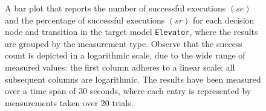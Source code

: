 \begin{figure}[h!]
\centering
\begin{minipage}{1\textwidth}
  \centering
  \makebox[\textwidth][c]{ %
        \resizebox{1.19\textwidth}{!}{ %
            
        }%
    }%
\end{minipage}
\caption{A bar plot that reports the number of successful executions $(se)$ and the percentage of successful executions $(sr)$ for each decision node and transition in the target model \texttt{Elevator}, where the results are grouped by the measurement type. Observe that the success count is depicted in a logarithmic scale, due to the wide range of measured values: the first column adheres to a linear scale; all subsequent columns are logarithmic. The results have been measured over a time span of 30 seconds, where each entry is represented by measurements taken over 20 trials.}
\label{figure:counting_logging_transition_frequency_comparison_elevator}
\end{figure}